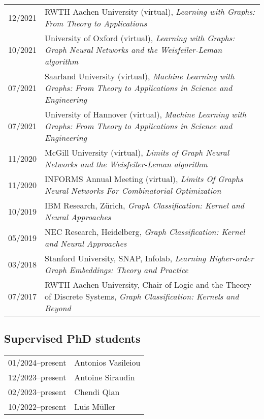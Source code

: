 \documentclass[11pt, a4paper, DIV=14, headings=small]{scrartcl}
\begin{document}
\begin{longtabu}{p{2.1cm}p{12.0cm}}
		12/2021 & RWTH Aachen University (virtual), \emph{Learning with Graphs: From Theory to Applications}                                                                                                                                                                                    \\
		10/2021 & University of Oxford (virtual), \emph{Learning with Graphs: Graph Neural Networks and the Weisfeiler-Leman algorithm}                                                                                                                                                         \\
		07/2021 & Saarland University (virtual), \emph{Machine Learning with Graphs: From Theory to Applications in Science and Engineering} \\
		07/2021 & University of Hannover (virtual), \emph{Machine Learning with Graphs:
			From Theory to Applications in Science and Engineering}                                                                              \\
		11/2020 & McGill University (virtual), \emph{Limits of Graph Neural Networks and the Weisfeiler-Leman algorithm}                     \\
		11/2020 & INFORMS Annual Meeting (virtual), \emph{Limits Of Graphs Neural Networks For Combinatorial Optimization}                   \\
		10/2019 & IBM Research, Zürich, \emph{Graph Classification: Kernel and Neural Approaches}                                            \\
		05/2019 & NEC Research, Heidelberg, \emph{Graph Classification: Kernel and Neural Approaches}                                        \\
		03/2018 & Stanford University, SNAP, Infolab, \emph{Learning Higher-order Graph Embeddings: Theory and Practice}                     \\
		07/2017 & RWTH Aachen University, Chair of Logic and the Theory of Discrete Systems, \emph{Graph Classification: Kernels and Beyond} \\
	\end{longtabu}
	
	\subsection*{Supervised PhD students}
	\begin{longtabu}{p{2.1cm}p{12.0cm}}
		01/2024--present & Antonios Vasileiou \\
		12/2023--present & Antoine Siraudin \\
		02/2023--present & Chendi Qian \\
		10/2022--present & Luis Müller \\
	\end{longtabu}
	
\end{document}

